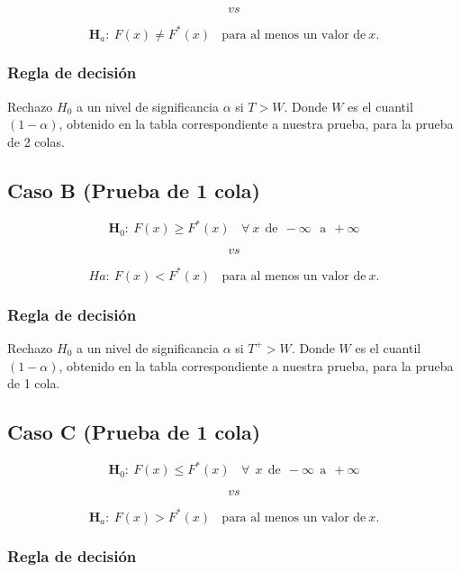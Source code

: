 \documentclass[
  a4paper,
  oneside,
  openany]{book}
\begin{document}
\[vs\]

\[\textbf{H}_a: \ F(x) \neq F^*(x) \ \ \ \ \mbox{para al menos un  valor de} \   x.\]

\hypertarget{regla-de-decisiuxf3n-27}{%
\subsubsection*{Regla de decisión}\label{regla-de-decisiuxf3n-27}}


Rechazo \(H_0\) a un nivel de significancia \(\alpha\) si \(T>W\). Donde \(W\) es el cuantil \((1-\alpha)\), obtenido en la tabla correspondiente a nuestra prueba, para la prueba de 2 colas.

\hypertarget{caso-b-prueba-de-1-cola-1}{%
\subsection*{Caso B (Prueba de 1 cola)}\label{caso-b-prueba-de-1-cola-1}}


\[\textbf{H}_0: \ F(x) \geq F^*(x) \ \ \ \ \forall\ x\ \ \mbox{de} \ \ -\infty \  \ \  \mbox{a} \ \ +\infty\]

\[vs\]

\[Ha: \ F(x) < F^*(x) \ \ \ \ \mbox{para al menos un valor de} \  x.\]

\hypertarget{regla-de-decisiuxf3n-28}{%
\subsubsection*{Regla de decisión}\label{regla-de-decisiuxf3n-28}}


Rechazo \(H_0\) a un nivel de significancia \(\alpha\) si \(T^+>W\). Donde \(W\) es el cuantil \((1-\alpha)\), obtenido en la tabla correspondiente a nuestra prueba, para la prueba de 1 cola.

\hypertarget{caso-c-prueba-de-1-cola-1}{%
\subsection*{Caso C (Prueba de 1 cola)}\label{caso-c-prueba-de-1-cola-1}}


\[\textbf{H}_0:\ F(x) \leq F^*(x) \ \ \ \ \forall \ \ x \ \  \mbox{de} \  \ -\infty \ \  \mbox{a} \ \  +\infty\]

\[vs\]

\[\textbf{H}_a: \ F(x) > F^*(x) \ \ \ \ \mbox{para al menos un valor de} \  x.\]

\hypertarget{regla-de-decisiuxf3n-29}{%
\subsubsection*{Regla de decisión}\label{regla-de-decisiuxf3n-29}}
\end{document}
